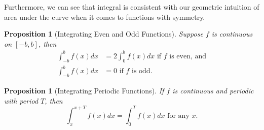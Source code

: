\documentclass[12pt]{article}
\newtheorem{prop}[thm]{Proposition}
\theoremstyle{definition}
\theoremstyle{plain}
\numberwithin{equation}{section}
\begin{document}
Furthermore, we can see that integral is consistent with our geometric intuition of area under the curve when it comes to functions with symmetry.
\begin{prop}[Integrating Even and Odd Functions]\label{SymInt}
  Suppose $f$ is continuous on $[-b, b]$, then
  \begin{align}
    \int_{-b}^{b}f(x)dx&=2\int_{0}^{b}f(x)dx \text{ if  $f$ is even, and}\\
    \int_{-b}^{b}f(x)dx&=0  \text{ if  $f$ is odd}.
  \end{align}
\end{prop}

\begin{prop}[Integrating Periodic Functions]\label{PerInt}
  If $f$ is continuous and periodic with period $T$, then \begin{equation}
      \int_{x}^{x+T}f(x)dx=\int_{0}^{T}f(x)dx \text{ for any $x$.}
  \end{equation}
\end{prop}
\end{document}

